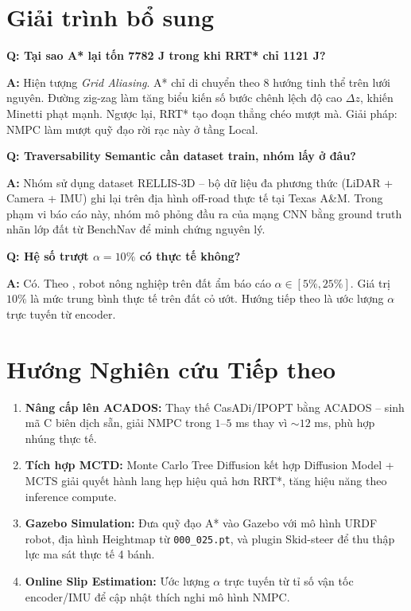 \documentclass[12pt, a4paper]{article}
\begin{document}
\section{Giải trình bổ sung}

\textbf{Q: Tại sao A* lại tốn 7782 J trong khi RRT* chỉ 1121 J?}

\textbf{A:} Hiện tượng \textit{Grid Aliasing}. A* chỉ di chuyển theo 8 hướng tinh thể trên lưới nguyên. Đường zig-zag làm tăng biểu kiến số bước chênh lệch độ cao $\Delta z$, khiến Minetti phạt mạnh. Ngược lại, RRT* tạo đoạn thẳng chéo mượt mà. Giải pháp: NMPC làm mượt quỹ đạo rời rạc này ở tầng Local.

\textbf{Q: Traversability Semantic cần dataset train, nhóm lấy ở đâu?}

\textbf{A:} Nhóm sử dụng dataset RELLIS-3D \cite{jiang2021rellis} -- bộ dữ liệu đa phương thức (LiDAR + Camera + IMU) ghi lại trên địa hình off-road thực tế tại Texas A\&M. Trong phạm vi báo cáo này, nhóm mô phỏng đầu ra của mạng CNN bằng ground truth nhãn lớp đất từ BenchNav để minh chứng nguyên lý.

\textbf{Q: Hệ số trượt $\alpha = 10\%$ có thực tế không?}

\textbf{A:} Có. Theo \cite{higa2019}, robot nông nghiệp trên đất ẩm báo cáo $\alpha \in [5\%, 25\%]$. Giá trị $10\%$ là mức trung bình thực tế trên đất cỏ ướt. Hướng tiếp theo là ước lượng $\alpha$ trực tuyến từ encoder.

\section{Hướng Nghiên cứu Tiếp theo}

\begin{enumerate}
    \item \textbf{Nâng cấp lên ACADOS:} Thay thế CasADi/IPOPT bằng ACADOS -- sinh mã C biên dịch sẵn, giải NMPC trong $1$--$5$ ms thay vì $\sim 12$ ms, phù hợp nhúng thực tế.
    \item \textbf{Tích hợp MCTD:} Monte Carlo Tree Diffusion \cite{yoon2025} kết hợp Diffusion Model + MCTS giải quyết hành lang hẹp hiệu quả hơn RRT*, tăng hiệu năng theo inference compute.
    \item \textbf{Gazebo Simulation:} Đưa quỹ đạo A* vào Gazebo với mô hình URDF robot, địa hình Heightmap từ \texttt{000\_025.pt}, và plugin Skid-steer để thu thập lực ma sát thực tế 4 bánh.
    \item \textbf{Online Slip Estimation:} Ước lượng $\alpha$ trực tuyến từ tỉ số vận tốc encoder/IMU để cập nhật thích nghi mô hình NMPC.
\end{enumerate}
\end{document}

